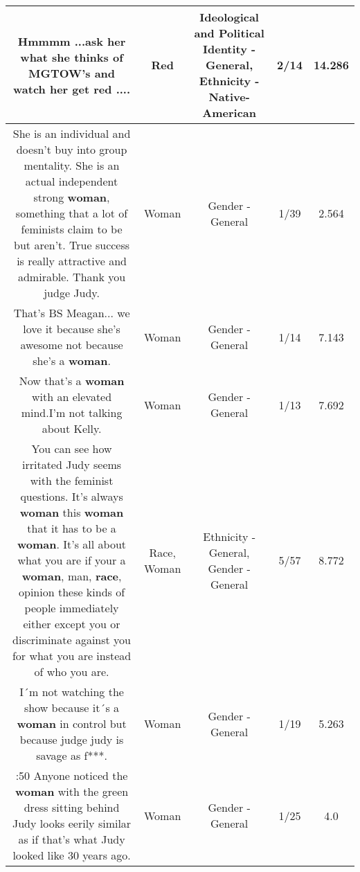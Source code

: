 \documentclass[11pt]{article}
\newlength\mylength
\begin{document}
\begin{center}
\begin{longtable}{|C{.65\mylength}|C{.30\mylength}|C{.12\mylength}|C{.12\mylength}|C{.12\mylength}|}
  \small Hmmmm ...ask her what she thinks of MGTOW's and watch her get \textbf{r\textbf{ed}} ....\normalsize   & Red &  Ideological and Political Identity - General, Ethnicity - Native-American & 2/14 & 14.286 \\  \hline
  \small She is an individual and doesn't buy into group mentality. She is an actual independent strong \textbf{woman}, something that a lot of feminists claim to be but aren't. True success is really attractive and admirable. Thank you judge Judy.\normalsize   & Woman & Gender - General & 1/39 & 2.564 \\  \hline
  \small That's BS Meagan... we love it because she's awesome not because she's a \textbf{woman}.\normalsize   & Woman & Gender - General & 1/14 & 7.143 \\  \hline
  \small Now that's a \textbf{woman} with an elevated mind.I'm not talking about Kelly.\normalsize   & Woman & Gender - General & 1/13 & 7.692 \\  \hline
  \small You can see how irritated Judy seems with the feminist questions. It's always \textbf{woman} this \textbf{woman} that it has to be a \textbf{woman}. It's all about what you are if your a \textbf{woman}, man, \textbf{race}, opinion these kinds of people immediately either except you or discriminate against you for what you are instead of who you are.\normalsize   & Race, Woman & Ethnicity - General, Gender - General & 5/57 & 8.772 \\  \hline
  \small I´m not watching the show because it´s a \textbf{woman} in control but because judge judy is savage as f***.\normalsize   & Woman & Gender - General & 1/19 & 5.263 \\  \hline
  \small :50 Anyone noticed the \textbf{woman} with the green dress sitting behind Judy looks eerily similar as if that's what Judy looked like 30 years ago.\normalsize   & Woman & Gender - General & 1/25 & 4.0 \\  \hline

\end{longtable}
\end{center}
\end{document}
